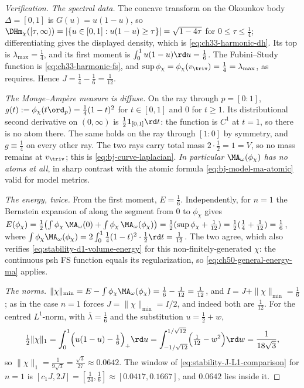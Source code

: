 \begin{proof}[Verification]
\emph{The spectral data.}  The concave transform on the Okounkov body
$\Delta=[0,1]$ is $G(u)=u(1-u)$, so
$\DHm_\chi([\tau,\infty))=\lvert\{u\in[0,1]:u(1-u)\ge\tau\}\rvert
=\sqrt{1-4\tau}$ for $0\le\tau\le\tfrac14$; differentiating gives the
displayed density, which is \eqref{eq:ch33-harmonic-dh}.  Its top is
$\lambda_{\max}=\tfrac14$, and its first moment is
$\int_0^1u(1-u)\rd u=\tfrac16$.  The Fubini--Study function is
\eqref{eq:ch33-harmonic-fs}, and $\sup\phi_\chi=\phi_\chi(v_{\triv})
=\tfrac14=\lambda_{\max}$, as  requires.
Hence $J=\tfrac14-\tfrac16=\tfrac1{12}$.

\emph{The Monge--Amp\`ere measure is diffuse.}  On the ray through
$p=[0:1]$, $g(t):=\phi_\chi(t\ord_p)=\tfrac14(1-t)^2$ for
$t\in[0,1]$ and $0$ for $t\ge1$.  Its distributional second
derivative on $(0,\infty)$ is $\tfrac12\mathbf 1_{[0,1]}\rd t$: the
function is $C^1$ at $t=1$, so there is no atom there.  The same holds
on the ray through $[1:0]$ by symmetry, and $g\equiv\tfrac14$ on every
other ray.  The two rays carry total mass
$2\cdot\tfrac12=1=V$, so no mass remains at $v_{\triv}$; this is
\eqref{eq:bj-curve-laplacian}.  \emph{In particular
$\MA_\omega(\phi_\chi)$ has no atoms at all}, in sharp contrast with the
atomic formula \eqref{eq:bj-model-ma-atomic} valid for model metrics.

\emph{The energy, twice.}  From the first moment, $E=\tfrac16$.
Independently, for $n=1$ the Bernstein expansion of
 along the segment from $0$ to
$\phi_\chi$ gives
$E(\phi_\chi)=\tfrac12\bigl(\int\phi_\chi\,\MA_\omega(0)
+\int\phi_\chi\,\MA_\omega(\phi_\chi)\bigr)
=\tfrac12(\sup\phi_\chi+\tfrac1{12})
=\tfrac12(\tfrac14+\tfrac1{12})=\tfrac16$, where
$\int\phi_\chi\MA_\omega(\phi_\chi)
=2\int_0^1\tfrac14(1-t)^2\cdot\tfrac12\rd t=\tfrac1{12}$.  The two agree,
which also verifies \eqref{eq:stability-d1-volume-energy} for this
non-finitely-generated $\chi$: the continuous psh FS function equals
its regularization, so \eqref{eq:ch50-general-energy-ma} applies.

\emph{The norms.}  $\|\chi\|_{\min}=E-\int\phi_\chi\MA_\omega(\phi_\chi)
=\tfrac16-\tfrac1{12}=\tfrac1{12}$, and
$I=J+\|\chi\|_{\min}=\tfrac16$; as in  the case
$n=1$ forces $J=\|\chi\|_{\min}=I/2$, and indeed both are
$\tfrac1{12}$.  For the centred $L^1$-norm, with
$\bar\lambda=\tfrac16$ and the substitution $u=\tfrac12+w$,
\[
 \tfrac12\|\chi\|_1=\int_0^1\Bigl(u(1-u)-\tfrac16\Bigr)_+\rd u
 =\int_{-1/\sqrt{12}}^{1/\sqrt{12}}\Bigl(\tfrac1{12}-w^2\Bigr)\rd w
 =\frac{1}{18\sqrt3},
\]
so $\|\chi\|_1=\tfrac1{9\sqrt3}=\tfrac{\sqrt3}{27}\approx0.0642$.  The
window of \eqref{eq:stability-J-L1-comparison} for $n=1$ is
$[c_1J,2J]=[\tfrac1{24},\tfrac16]\approx[0.0417,0.1667]$, and
$0.0642$ lies inside it.


\end{proof}
